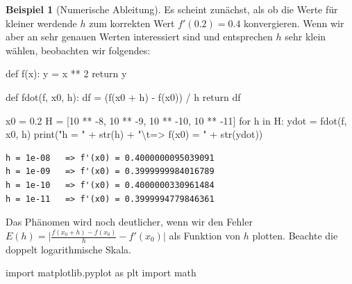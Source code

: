 \documentclass[
  letterpaper,
  DIV=11]{scrreprt}
\newenvironment{Shaded}{\begin{snugshade}}{\end{snugshade}}
\newcommand{\BuiltInTok}[1]{\textcolor[rgb]{0.00,0.23,0.31}{#1}}
\newcommand{\CharTok}[1]{\textcolor[rgb]{0.13,0.47,0.30}{#1}}
\newcommand{\ControlFlowTok}[1]{\textcolor[rgb]{0.00,0.23,0.31}{#1}}
\newcommand{\DecValTok}[1]{\textcolor[rgb]{0.68,0.00,0.00}{#1}}
\newcommand{\FloatTok}[1]{\textcolor[rgb]{0.68,0.00,0.00}{#1}}
\newcommand{\ImportTok}[1]{\textcolor[rgb]{0.00,0.46,0.62}{#1}}
\newcommand{\KeywordTok}[1]{\textcolor[rgb]{0.00,0.23,0.31}{#1}}
\newcommand{\NormalTok}[1]{\textcolor[rgb]{0.00,0.23,0.31}{#1}}
\newcommand{\OperatorTok}[1]{\textcolor[rgb]{0.37,0.37,0.37}{#1}}
\newcommand{\StringTok}[1]{\textcolor[rgb]{0.13,0.47,0.30}{#1}}
\theoremstyle{definition}
\newtheorem{example}{Beispiel}[chapter]
\theoremstyle{remark}
\begin{document}
\begin{example}[Numerische Ableitung]
Es scheint zunächst, als ob die Werte für kleiner werdende \(h\) zum
korrekten Wert \(f'(0.2)=0.4\) konvergieren. Wenn wir aber an sehr
genauen Werten interessiert sind und entsprechen \(h\) sehr klein
wählen, beobachten wir folgendes:

\begin{Shaded}
\begin{Highlighting}[]
\KeywordTok{def}\NormalTok{ f(x):}
\NormalTok{    y }\OperatorTok{=}\NormalTok{ x }\OperatorTok{**} \DecValTok{2}
    \ControlFlowTok{return}\NormalTok{ y}

\KeywordTok{def}\NormalTok{ fdot(f, x0, h):}
\NormalTok{    df }\OperatorTok{=}\NormalTok{ (f(x0 }\OperatorTok{+}\NormalTok{ h) }\OperatorTok{{-}}\NormalTok{ f(x0)) }\OperatorTok{/}\NormalTok{ h}
    \ControlFlowTok{return}\NormalTok{ df}

\NormalTok{x0 }\OperatorTok{=} \FloatTok{0.2}
\NormalTok{H }\OperatorTok{=}\NormalTok{ [}\DecValTok{10} \OperatorTok{**} \OperatorTok{{-}}\DecValTok{8}\NormalTok{, }\DecValTok{10} \OperatorTok{**} \OperatorTok{{-}}\DecValTok{9}\NormalTok{, }\DecValTok{10} \OperatorTok{**} \OperatorTok{{-}}\DecValTok{10}\NormalTok{, }\DecValTok{10} \OperatorTok{**} \OperatorTok{{-}}\DecValTok{11}\NormalTok{]}
\ControlFlowTok{for}\NormalTok{ h }\KeywordTok{in}\NormalTok{ H:}
\NormalTok{    ydot }\OperatorTok{=}\NormalTok{ fdot(f, x0, h)}
    \BuiltInTok{print}\NormalTok{(}\StringTok{"h = "} \OperatorTok{+} \BuiltInTok{str}\NormalTok{(h) }\OperatorTok{+} \StringTok{"}\CharTok{\textbackslash{}t}\StringTok{=\textgreater{} f\textquotesingle{}(x0) = "} \OperatorTok{+} \BuiltInTok{str}\NormalTok{(ydot))}
\end{Highlighting}
\end{Shaded}

\begin{verbatim}
h = 1e-08   => f'(x0) = 0.4000000095039091
h = 1e-09   => f'(x0) = 0.3999999984016789
h = 1e-10   => f'(x0) = 0.4000000330961484
h = 1e-11   => f'(x0) = 0.3999994779846361
\end{verbatim}

Das Phänomen wird noch deutlicher, wenn wir den Fehler
\(E(h) = \lvert\frac{f(x_0+h)-f(x_0)}{h} - f'(x_0)\rvert\) als Funktion
von \(h\) plotten. Beachte die doppelt logarithmische Skala.

\begin{Shaded}
\begin{Highlighting}[]
\ImportTok{import}\NormalTok{ matplotlib.pyplot }\ImportTok{as}\NormalTok{ plt}
\ImportTok{import}\NormalTok{ math}


\end{Highlighting}
\end{Shaded}
\end{example}
\end{document}
